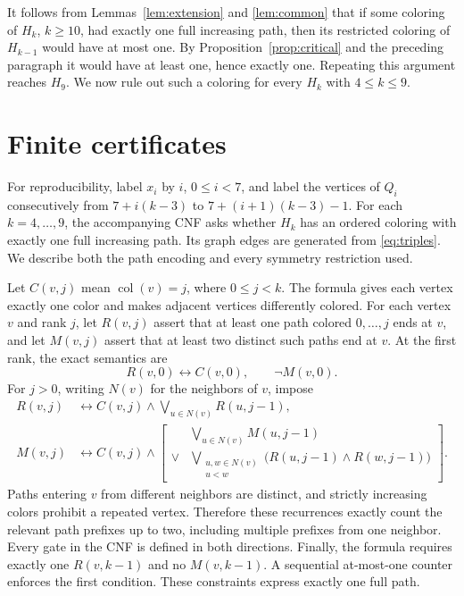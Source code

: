 \documentclass[11pt]{amsart}
\newcommand{\col}{\operatorname{col}}
\begin{document}
It follows from Lemmas~\ref{lem:extension} and \ref{lem:common} that
if some coloring of $H_k$, $k\geq10$, had exactly one full increasing
path, then its restricted coloring of $H_{k-1}$ would have at most
one.  By Proposition~\ref{prop:critical} and the preceding paragraph
it would have at least one, hence exactly one.  Repeating this
argument reaches $H_9$.  We now rule out such a coloring for every
$H_k$ with $4\leq k\leq9$.

\section{Finite certificates}\label{sec:certificates}

For reproducibility, label $x_i$ by $i$, $0\leq i<7$, and label the
vertices of $Q_i$ consecutively from $7+i(k-3)$ to
$7+(i+1)(k-3)-1$.  For each $k=4,\ldots,9$, the accompanying CNF asks
whether $H_k$ has an ordered coloring with exactly one full
increasing path.  Its graph edges are generated from
\eqref{eq:triples}.  We describe both the path encoding and every
symmetry restriction used.

Let $C(v,j)$ mean $\col(v)=j$, where $0\leq j<k$.  The formula gives
each vertex exactly one color and makes adjacent vertices differently
colored.  For each vertex $v$ and rank $j$, let $R(v,j)$ assert that
at least one path colored $0,\ldots,j$ ends at $v$, and let $M(v,j)$
assert that at least two distinct such paths end at $v$.  At the first
rank, the exact semantics are
\[
 R(v,0)\longleftrightarrow C(v,0),\qquad \neg M(v,0).
\]
For $j>0$, writing $N(v)$ for the neighbors of $v$, impose
\begin{align}
 R(v,j)&\longleftrightarrow C(v,j)\land
           \bigvee_{u\in N(v)}R(u,j-1),\label{eq:reach}\\
 M(v,j)&\longleftrightarrow C(v,j)\land\left[
    \begin{aligned}
       &\bigvee_{u\in N(v)}M(u,j-1)\\
       {}\lor{}&\bigvee_{\substack{u,w\in N(v)\\u<w}}
                 \bigl(R(u,j-1)\land R(w,j-1)\bigr)
    \end{aligned}\right].
           \label{eq:multiple}
\end{align}
Paths entering $v$ from different neighbors are distinct, and
strictly increasing colors prohibit a repeated vertex.  Therefore
these recurrences exactly count the relevant path prefixes up to
two, including multiple prefixes from one neighbor.  Every gate in
the CNF is defined in both directions.  Finally, the formula
requires exactly one $R(v,k-1)$ and no $M(v,k-1)$.  A sequential
at-most-one counter enforces the first condition.  These constraints
express exactly one full path.
\end{document}
